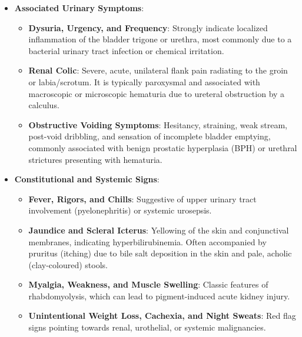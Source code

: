 \begin{itemize}
\begin{itemize}
    \item \textbf{Purple (Purple Urine Bag Syndrome)}: Exclusively observed in catheterized, often chronically ill or institutionalized patients. The urine inside the drainage bag and tubing turns purple, which can cause significant caregiver distress, although the patient may remain minimally symptomatic.
    \item \textbf{Milky or Cloudy (Chyluria or Pyuria)}: Indicates the presence of lipids/lymph (chyluria, due to lymphatic-urinary fistulas often caused by filariasis) or pus/white blood cells (pyuria, due to severe urinary tract infection).
  \end{itemize}

  \item \textbf{Associated Urinary Symptoms}:
  \begin{itemize}
    \item \textbf{Dysuria, Urgency, and Frequency}: Strongly indicate localized inflammation of the bladder trigone or urethra, most commonly due to a bacterial urinary tract infection or chemical irritation.
    \item \textbf{Renal Colic}: Severe, acute, unilateral flank pain radiating to the groin or labia/scrotum. It is typically paroxysmal and associated with macroscopic or microscopic hematuria due to ureteral obstruction by a calculus.
    \item \textbf{Obstructive Voiding Symptoms}: Hesitancy, straining, weak stream, post-void dribbling, and sensation of incomplete bladder emptying, commonly associated with benign prostatic hyperplasia (BPH) or urethral strictures presenting with hematuria.
  \end{itemize}

  \item \textbf{Constitutional and Systemic Signs}:
  \begin{itemize}
    \item \textbf{Fever, Rigors, and Chills}: Suggestive of upper urinary tract involvement (pyelonephritis) or systemic urosepsis.
    \item \textbf{Jaundice and Scleral Icterus}: Yellowing of the skin and conjunctival membranes, indicating hyperbilirubinemia. Often accompanied by pruritus (itching) due to bile salt deposition in the skin and pale, acholic (clay-coloured) stools.
    \item \textbf{Myalgia, Weakness, and Muscle Swelling}: Classic features of rhabdomyolysis, which can lead to pigment-induced acute kidney injury.
    \item \textbf{Unintentional Weight Loss, Cachexia, and Night Sweats}: Red flag signs pointing towards renal, urothelial, or systemic malignancies.
  \end{itemize}
\end{itemize}

